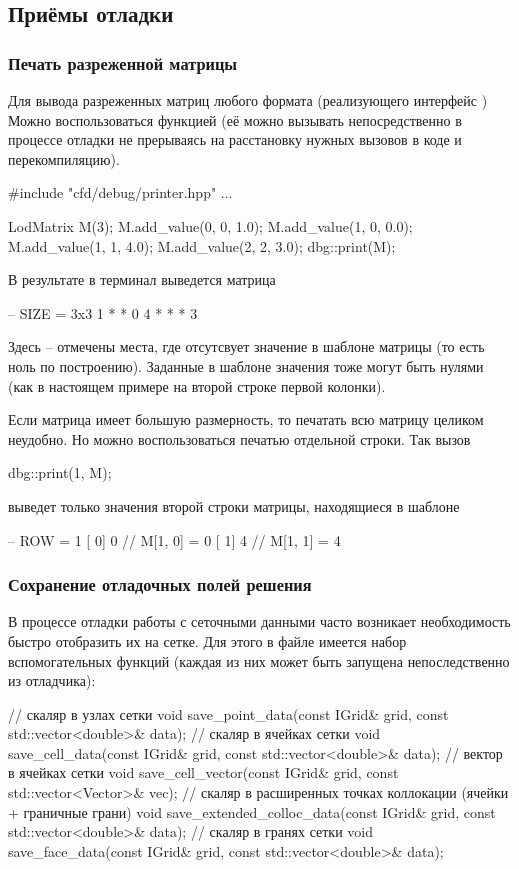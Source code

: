 \subsection{Приёмы отладки}
\label{sec:debug}
\subsubsection{Печать разреженной матрицы}
\label{sec:dbg-print-csr}
Для вывода разреженных матриц любого формата
(реализующего интерфейс )
Можно воспользоваться функцией 
(её можно вызывать непосредственно в процессе отладки
не прерываясь на расстановку нужных вызовов в коде и перекомпиляцию).
\begin{cppcode}
#include "cfd/debug/printer.hpp"
...

LodMatrix M(3);
M.add_value(0, 0, 1.0); 
M.add_value(1, 0, 0.0); 
M.add_value(1, 1, 4.0); 
M.add_value(2, 2, 3.0); 
dbg::print(M);
\end{cppcode}
В результате в терминал выведется матрица
\begin{shelloutput}
-- SIZE = 3x3
     1      *      *
     0      4      *
     *      *      3
\end{shelloutput}
Здесь \cvar{*} -- отмечены места, где отсутсвует значение в шаблоне матрицы (то есть ноль по построению).
Заданные в шаблоне значения тоже могут быть нулями (как в настоящем примере на второй строке первой колонки).

Если матрица имеет большую размерность, то печатать всю матрицу целиком неудобно.
Но можно воспользоваться печатью отдельной строки.
Так вызов
\begin{cppcode}
dbg::print(1, M);
\end{cppcode}
выведет только значения второй строки матрицы, находящиеся в шаблоне
\begin{shelloutput}
-- ROW = 1
   [   0] 0   // M[1, 0] = 0
   [   1] 4   // M[1, 1] = 4
\end{shelloutput}

\subsubsection{Сохранение отладочных полей решения}
В процессе отладки работы с сеточными данными
часто возникает необходимость быстро отобразить
их на сетке. Для этого в файле 
имеется набор вспомогательных функций (каждая из них может быть запущена непоследственно из отладчика):

\begin{cppcode}
// скаляр в узлах сетки
void save_point_data(const IGrid& grid, const std::vector<double>& data);
// скаляр в ячейках сетки
void save_cell_data(const IGrid& grid, const std::vector<double>& data);
// вектор в ячейках сетки
void save_cell_vector(const IGrid& grid, const std::vector<Vector>& vec);
// скаляр в расширенных точках коллокации (ячейки + граничные грани)
void save_extended_colloc_data(const IGrid& grid, const std::vector<double>& data);
// скаляр в гранях сетки
void save_face_data(const IGrid& grid, const std::vector<double>& data);
\end{cppcode}

